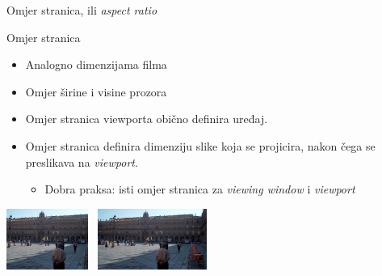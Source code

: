 \documentclass[9pt]{beamer}
\begin{document}
\begin{frame}{Omjer stranica, ili \textsl{aspect ratio}}
	\begin{block}{Omjer stranica}
		\begin{itemize}
			\item Analogno dimenzijama filma
			\item Omjer širine i visine prozora
			\item Omjer stranica viewporta obično definira uređaj.
			\item Omjer stranica definira dimenziju slike koja se projicira, nakon čega se preslikava na \textsl{viewport}.
			\begin{itemize}
				\item Dobra praksa: isti omjer stranica za \textsl{viewing window} i \textsl{viewport}
			\end{itemize}
		\end{itemize}
	\end{block}
	\begin{center}
		\includegraphics[height=2cm]{slike/Aspect_ratio_4_3_example.jpg}  \ 
		\includegraphics[height=2cm]{slike/Aspect_ratio_16_9_example.jpg}
	\end{center}
	
\end{frame}
\end{document}
